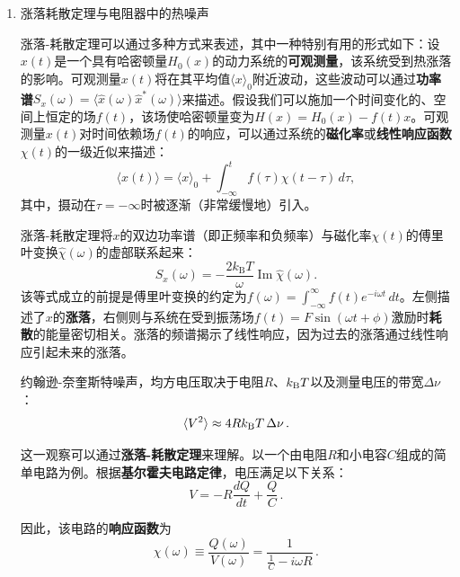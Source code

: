 \documentclass[dvipsnames, svgnames,a4paper,11pt]{article}
\begin{document}
\begin{enumerate}
\begin{enumerate}
			\item 涨落耗散定理与电阻器中的热噪声
			
			涨落-耗散定理可以通过多种方式来表述，其中一种特别有用的形式如下：设$x(t)$是一个具有哈密顿量$H_0(x)$的动力系统的\textbf{可观测量}，该系统受到热涨落的影响。可观测量$x(t)$将在其平均值$\langle x\rangle_0$附近波动，这些波动可以通过\textbf{功率谱}$S_x(\omega) = \langle \hat{x}(\omega)\hat{x}^*(\omega) \rangle$来描述。假设我们可以施加一个时间变化的、空间上恒定的场$f(t)$，该场使哈密顿量变为$H(x) = H_0(x) - f(t)x$。可观测量$x(t)$对时间依赖场$f(t)$的响应，可以通过系统的\textbf{磁化率}或\textbf{线性响应函数}$\chi(t)$的一级近似来描述：
			\begin{equation*}
				\langle x(t) \rangle = \langle x \rangle_0 + \int_{-\infty}^{t} f(\tau) \chi(t-\tau) \, d\tau,
			\end{equation*}
			其中，摄动在$\tau = -\infty$时被逐渐（非常缓慢地）引入。
			
			涨落-耗散定理将$x$的双边功率谱（即正频率和负频率）与磁化率$\chi(t)$的傅里叶变换$\hat{\chi}(\omega)$的虚部联系起来：
			\begin{equation*}
				S_x(\omega) = -\frac{2 k_\mathrm{B} T}{\omega} \operatorname{Im}\hat{\chi}(\omega).
			\end{equation*}
			该等式成立的前提是傅里叶变换的约定为$f(\omega) = \int_{-\infty}^{\infty} f(t) e^{-i\omega t} \, dt$。左侧描述了$x$的\textbf{涨落}，右侧则与系统在受到振荡场$f(t) = F \sin(\omega t + \phi)$激励时\textbf{耗散}的能量密切相关。涨落的频谱揭示了线性响应，因为过去的涨落通过线性响应引起未来的涨落。
			
			约翰逊-奈奎斯特噪声，均方电压取决于电阻$R$、$k_{\rm B}T$以及测量电压的带宽$\Delta\nu$：
			\begin{equation*}
				\langle V^2 \rangle \approx 4Rk_{\rm B}T\,\Delta\nu \, .
			\end{equation*}
			
			这一观察可以通过\textbf{涨落-耗散定理}来理解。以一个由电阻$R$和小电容$C$组成的简单电路为例。根据\textbf{基尔霍夫电路定律}，电压满足以下关系：
			\begin{equation*}
				V = -R\frac{dQ}{dt} + \frac{Q}{C} \, .
			\end{equation*}
			
			因此，该电路的\textbf{响应函数}为
			\begin{equation*}
				\chi(\omega) \equiv \frac{Q(\omega)}{V(\omega)} = \frac{1}{\frac{1}{C} - i\omega R} \, .
			\end{equation*}
			

\end{enumerate}
\end{enumerate}
\end{document}
